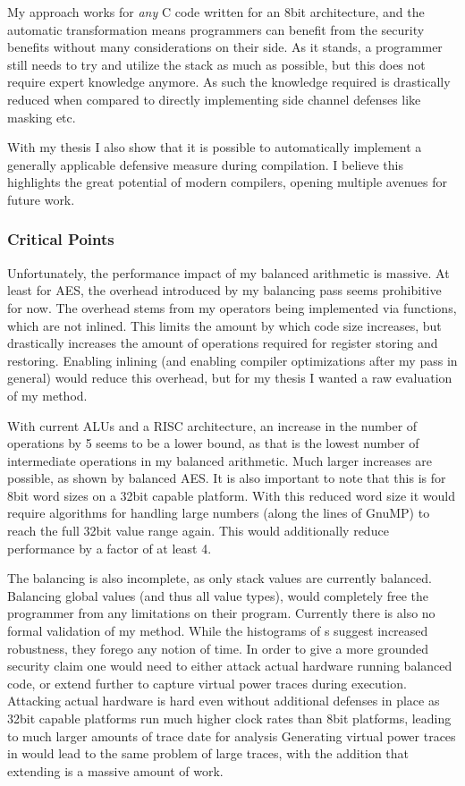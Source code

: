 My approach works for \emph{any} C code written for an 8bit architecture, and the automatic transformation means programmers can benefit from the security benefits without many considerations on their side.
As it stands, a programmer still needs to try and utilize the stack as much as possible, but this does not require expert knowledge anymore.
As  such the knowledge required is drastically reduced when compared to directly implementing side channel defenses like masking etc.

With my thesis I also show that it is possible to automatically implement a generally applicable defensive measure during compilation.
I believe this highlights the great potential of modern compilers, opening multiple avenues for future work.

\subsubsection{Critical Points}
Unfortunately, the performance impact of my balanced arithmetic is massive.
At least for AES, the overhead introduced by my balancing pass seems prohibitive for now.
The overhead stems from my operators being implemented via functions, which are not inlined.
This limits the amount by which code size increases, but drastically increases the amount of operations required for register storing and restoring.
Enabling inlining (and enabling compiler optimizations after my pass in general) would reduce this overhead, but for my thesis I wanted a raw evaluation of my method.

With current ALUs and a RISC architecture, an increase in the number of operations by 5 seems to be a lower bound, as that is the lowest number of intermediate operations in my balanced arithmetic.
Much larger increases are possible, as shown by balanced AES.
It is also important to note that this is for 8bit word sizes on a 32bit capable platform.
With this reduced word size it would require algorithms for handling large numbers (along the lines of GnuMP\cite{granlund1996gnu}) to reach the full 32bit value range again.
This would additionally reduce performance by a factor of at least 4.

The balancing is also incomplete, as only stack values are currently balanced.
Balancing global values (and thus all value types), would completely free the programmer from any limitations on their program.
Currently there is also no formal validation of my method.
While the histograms of \hammingw{}s suggest increased robustness, they forego any notion of time.
In order to give a more grounded security claim one would need to either attack actual hardware running balanced code, or extend \qemu{} further to capture virtual power traces during execution.
Attacking actual hardware is hard even without additional defenses in place as 32bit capable platforms run much higher clock rates than 8bit platforms, leading to much larger amounts of trace date for analysis
Generating virtual power traces in \qemu{} would lead to the same problem of large traces, with the addition that extending \qemu{} is a massive amount of work.

